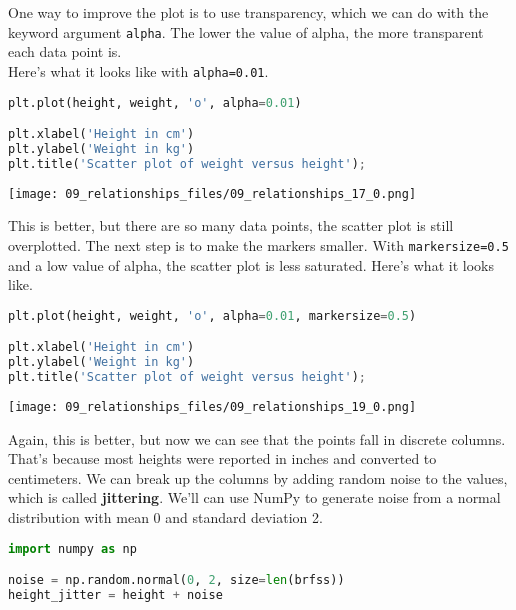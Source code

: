 One way to improve the plot is to use transparency, which we can do with
the keyword argument \passthrough{\lstinline!alpha!}. The lower the
value of alpha, the more transparent each data point is.\\
Here's what it looks like with \passthrough{\lstinline!alpha=0.01!}.

\begin{lstlisting}[language=Python,style=source]
plt.plot(height, weight, 'o', alpha=0.01)

plt.xlabel('Height in cm')
plt.ylabel('Weight in kg')
plt.title('Scatter plot of weight versus height');
\end{lstlisting}

\begin{center}
\texttt{[image: 09\_relationships\_files/09\_relationships\_17\_0.png]}
\end{center}

This is better, but there are so many data points, the scatter plot is
still overplotted. The next step is to make the markers smaller. With
\passthrough{\lstinline!markersize=0.5!} and a low value of alpha, the
scatter plot is less saturated. Here's what it looks like.

\begin{lstlisting}[language=Python,style=source]
plt.plot(height, weight, 'o', alpha=0.01, markersize=0.5)

plt.xlabel('Height in cm')
plt.ylabel('Weight in kg')
plt.title('Scatter plot of weight versus height');
\end{lstlisting}

\begin{center}
\texttt{[image: 09\_relationships\_files/09\_relationships\_19\_0.png]}
\end{center}

Again, this is better, but now we can see that the points fall in
discrete columns. That's because most heights were reported in inches
and converted to centimeters. We can break up the columns by adding
random noise to the values, which is called \textbf{jittering}. We'll
can use NumPy to generate noise from a normal distribution with mean 0
and standard deviation 2.

\begin{lstlisting}[language=Python,style=source]
import numpy as np

noise = np.random.normal(0, 2, size=len(brfss))
height_jitter = height + noise
\end{lstlisting}

